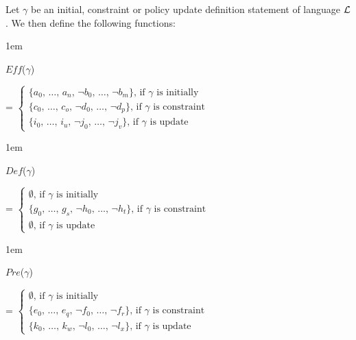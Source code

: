 \documentclass[global,twocolumn,final]{svjour}
\newenvironment{vquote}
  {\begin{list}{}{\leftmargin 1em}\item[]}
  {\end{list}}
\begin{document}
    Let $\gamma$ be an initial, constraint or policy update definition
    statement of language ${\cal L}$. We then define the following functions:

    \begin{vquote}
      $Eff$($\gamma$)

      \hspace{1em}
      =
      \begin{math}
        \begin{cases}
          \mbox{\{$a_{0}$, \ldots, $a_{n}$, $\lnot$$b_{0}$, \ldots, $\lnot$$b_{m}$\}, if $\gamma$ is initially} \\
          \mbox{\{$c_{0}$, \ldots, $c_{o}$, $\lnot$$d_{0}$, \ldots, $\lnot$$d_{p}$\}, if $\gamma$ is constraint} \\
          \mbox{\{$i_{0}$, \ldots, $i_{u}$, $\lnot$$j_{0}$, \ldots, $\lnot$$j_{v}$\}, if $\gamma$ is update}
        \end{cases}
      \end{math}
    \end{vquote}

    \begin{vquote}
      $Def$($\gamma$)

      \hspace{1em}
      =
      \begin{math}
        \begin{cases}
          \mbox{$\emptyset$, if $\gamma$ is initially} \\
          \mbox{\{$g_{0}$, \ldots, $g_{s}$, $\lnot$$h_{0}$, \ldots, $\lnot$$h_{t}$\}, if $\gamma$ is constraint} \\
          \mbox{$\emptyset$, if $\gamma$ is update}
        \end{cases}
      \end{math}
    \end{vquote}

    \begin{vquote}
      $Pre$($\gamma$)

      \hspace{1em}
      =
      \begin{math}
        \begin{cases}
          \mbox{$\emptyset$, if $\gamma$ is initially} \\
          \mbox{\{$e_{0}$, \ldots, $e_{q}$, $\lnot$$f_{0}$, \ldots, $\lnot$$f_{r}$\}, if $\gamma$ is constraint} \\
          \mbox{\{$k_{0}$, \ldots, $k_{w}$, $\lnot$$l_{0}$, \ldots, $\lnot$$l_{x}$\}, if $\gamma$ is update}
        \end{cases}
      \end{math}
    \end{vquote}
\end{document}
